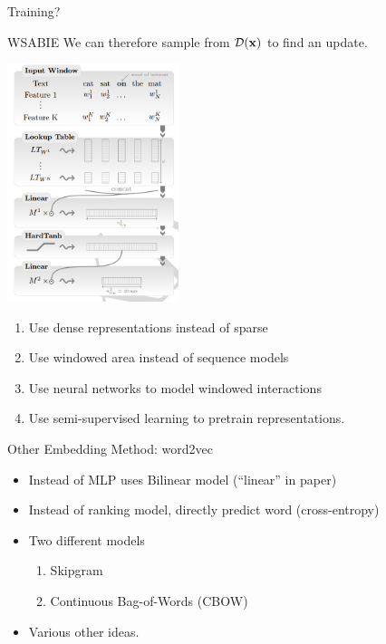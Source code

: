 \documentclass{beamer}
\begin{document}
\begin{frame}{Training?}
\begin{frame}{WSABIE}
  We can therefore sample from $\mathcal{D}(\mathbf{x})$ to find an update.
    
\end{frame}

\begin{frame}
  \begin{center}
    \includegraphics[width=5cm]{cwfull}
  \end{center}
  \begin{enumerate}
  \item Use dense representations instead of sparse
  \item Use windowed area instead of sequence models
  \item Use neural networks to model windowed interactions
  \item Use semi-supervised learning to pretrain representations.
  \end{enumerate}
\end{frame}

\begin{frame}{Other Embedding Method: word2vec}
  \begin{itemize}
  \item Instead of MLP uses Bilinear model (``linear'' in paper)
    \air 

  \item Instead of ranking model, directly predict word (cross-entropy)
    \air 

  \item Two different models 
    \begin{enumerate}
    \item Skipgram
    \item Continuous Bag-of-Words (CBOW)
    \end{enumerate}

  \item Various other ideas. 
    

\end{itemize}
\end{frame}
\end{frame}
\end{document}
